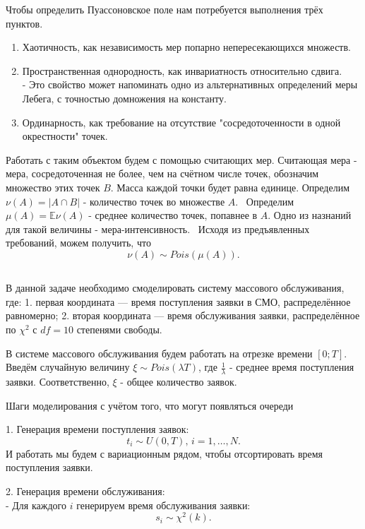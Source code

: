 \documentclass[11pt]{article}
\begin{document}
Чтобы определить Пуассоновское поле нам потребуется выполнения трёх пунктов.
\begin{enumerate}
  \item Хаотичность, как независимость мер попарно непересекающихся множеств.
  \item Пространственная однородность, как инвариатность относительно сдвига. \\
    - Это свойство может напоминать одно из альтернативных определений меры Лебега, с точностью домножения на константу.
  \item Ординарность, как требование на отсутствие "сосредоточенности в одной окрестности" точек.
\end{enumerate}

Работать с таким объектом будем с помощью считающих мер.
Считающая мера - мера, сосредоточенная не более, чем на счётном числе точек, обозначим множество этих точек $B$. Масса каждой точки будет равна единице. 
Определим $\nu(A) = |A \cap B|$ - количество точек во множестве $A$. \
Определим $\mu(A) = \mathbb{E} \nu(A)$ - среднее количество точек, попавнее в $A$. Одно из назнаний для такой величины - мера-интенсивность. \
Исходя из предъявленных требований, можем получить, что
$$
    \nu(A) \sim Pois(\mu(A)).
$$

\subsection{}

В данной задаче необходимо смоделировать систему массового обслуживания, где:
1. первая координата --- время поступления заявки в СМО, распределённое равномерно;
2. вторая координата --- время обслуживания заявки, распределённое по $\chi^2$ с $df=10$ степенями свободы.

В системе массового обслуживания будем работать на отрезке времени $[0;T]$. Введём случайную величину $\xi \sim Pois (\lambda T)$, где $\frac{1}{\lambda}$ - среднее время поступления заявки. Соответственно, $\xi$ - общее количество заявок.


Шаги моделирования с учётом того, что могут появляться очереди

1. Генерация времени поступления заявок:
   $$
   t_i \sim U(0, T), \, i = 1, \dots, N.
   $$
   И работать мы будем с вариационным рядом, чтобы отсортировать время поступления заявки.
   
2. Генерация времени обслуживания: \\
   - Для каждого $i$ генерируем время обслуживания заявки:
   $$
   s_i \sim \chi^2(k).
   $$
\end{document}
